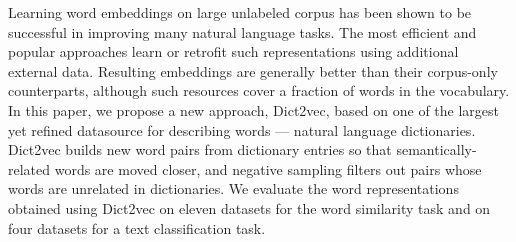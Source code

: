 Learning word embeddings on large unlabeled corpus has been shown to be successful in improving many natural language tasks. The most efficient and popular approaches learn or retrofit such representations using additional external data. Resulting embeddings are generally better than their corpus-only counterparts, although such resources cover a fraction of words in the vocabulary. In this paper, we propose a new approach, Dict2vec, based on one of the largest yet refined datasource for describing words --- natural language dictionaries. Dict2vec builds new word pairs from dictionary entries so that semantically-related words are moved closer, and negative sampling filters out pairs whose words are unrelated in dictionaries. We evaluate the word representations obtained using Dict2vec on eleven datasets for the word similarity task and on four datasets for a text classification task.
